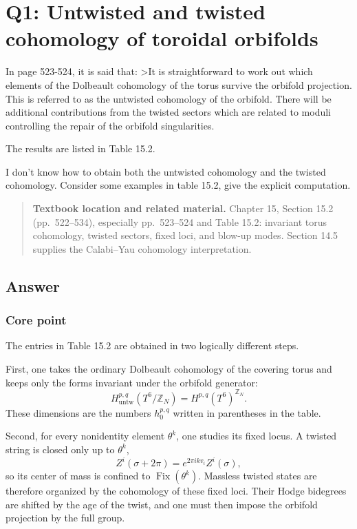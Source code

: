 \documentclass[
  10pt,
  a4paper,
  openany]{book}
\begin{document}
\section{Q1: Untwisted and twisted cohomology of toroidal
orbifolds}\label{q1-untwisted-and-twisted-cohomology-of-toroidal-orbifolds}

In page 523-524, it is said that: \textgreater It is straightforward to
work out which elements of the Dolbeault cohomology of the torus survive
the orbifold projection. This is referred to as the untwisted cohomology
of the orbifold. There will be additional contributions from the twisted
sectors which are related to moduli controlling the repair of the
orbifold singularities.

The results are listed in Table 15.2.

I don't know how to obtain both the untwisted cohomology and the twisted
cohomology. Consider some examples in table 15.2, give the explicit
computation.

\begin{quote}
\textbf{Textbook location and related material.} Chapter 15, Section
15.2 (pp.~522--534), especially pp.~523--524 and Table 15.2: invariant
torus cohomology, twisted sectors, fixed loci, and blow-up modes.
Section 14.5 supplies the Calabi--Yau cohomology interpretation.
\end{quote}

\subsection{Answer}\label{answer-21}

\subsubsection{Core point}\label{core-point-21}

The entries in Table 15.2 are obtained in two logically different steps.

First, one takes the ordinary Dolbeault cohomology of the covering torus
and keeps only the forms invariant under the orbifold generator: \[
H_{\mathrm{untw}}^{p,q}(T^6/\mathbb Z_N)
=H^{p,q}(T^6)^{\mathbb Z_N}.
\] These dimensions are the numbers \(h_0^{p,q}\) written in parentheses
in the table.

Second, for every nonidentity element \(\theta^k\), one studies its
fixed locus. A twisted string is closed only up to \(\theta^k\), \[
Z^i(\sigma+2\pi)
=e^{2\pi i k v_i}Z^i(\sigma),
\] so its center of mass is confined to
\(\operatorname{Fix}(\theta^k)\). Massless twisted states are therefore
organized by the cohomology of these fixed loci. Their Hodge bidegrees
are shifted by the age of the twist, and one must then impose the
orbifold projection by the full group.
\end{document}
